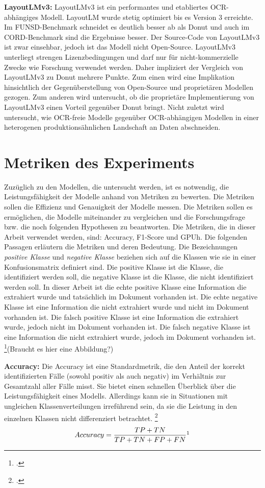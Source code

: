 \textbf{LayoutLMv3:} LayoutLMv3 ist ein performantes und etabliertes OCR-abhängiges Modell. LayoutLM wurde stetig optimiert bis es Version 3 erreichte. Im FUNSD-Benchmark schneidet es deutlich besser ab als Donut und auch im CORD-Benchmark sind die Ergebnisse besser. Der Source-Code von LayoutLMv3 ist zwar einsehbar, jedoch ist das Modell nicht Open-Source. LayoutLMv3 unterliegt strengen Lizenzbedingungen und darf nur für nicht-kommerzielle Zwecke wie Forschung verwendet werden. Daher impliziert der Vergleich von LayoutLMv3 zu Donut mehrere Punkte. Zum einen wird eine Implikation hinsichtlich der Gegenüberstellung von Open-Source und proprietären Modellen gezogen. Zum anderen wird untersucht, ob die proprietäre Implementierung von LayoutLMv3 einen Vorteil gegenüber Donut bringt. Nicht zuletzt wird untersucht, wie OCR-freie Modelle gegenüber OCR-abhängigen Modellen in einer heterogenen produktionsähnlichen Landschaft an Daten abschneiden.

\section{Metriken des Experiments}
Zuzüglich zu den Modellen, die untersucht werden, ist es notwendig, die Leistungsfähigkeit der Modelle anhand von Metriken zu bewerten. Die Metriken sollen die Effizienz und Genauigkeit der Modelle messen. Die Metriken sollen es ermöglichen, die Modelle miteinander zu vergleichen und die Forschungsfrage bzw. die noch folgenden Hypothesen zu beantworten. Die Metriken, die in dieser Arbeit verwendet werden, sind: Accuracy, F1-Score und \ac{GPUh}. Die folgenden Passagen erläutern die Metriken und deren Bedeutung. Die Bezeichnungen \emph{positive Klasse} und \emph{negative Klasse} beziehen sich auf die Klassen wie sie in einer Konfusionsmatrix definiert sind. Die positive Klasse ist die Klasse, die identifiziert werden soll, die negative Klasse ist die Klasse, die nicht identifiziert werden soll. In dieser Arbeit ist die echte positive Klasse eine Information die extrahiert wurde und tatsächlich im Dokument vorhanden ist. Die echte negative Klasse ist eine Information die nicht extrahiert wurde und nicht im Dokument vorhanden ist. Die falsch positive Klasse ist eine Information die extrahiert wurde, jedoch nicht im Dokument vorhanden ist. Die falsch negative Klasse ist eine Information die nicht extrahiert wurde, jedoch im Dokument vorhanden ist. \footcites[Vgl.][]{pawan_confusion_2019}(Braucht es hier eine Abbildung?)

\textbf{Accuracy:} Die Accuracy ist eine Standardmetrik, die den Anteil der korrekt identifizierten Fälle (sowohl positiv als auch negativ) im Verhältnis zur Gesamtzahl aller Fälle misst. Sie bietet einen schnellen Überblick über die Leistungsfähigkeit eines Modells. Allerdings kann sie in Situationen mit ungleichen Klassenverteilungen irreführend sein, da sie die Leistung in den einzelnen Klassen nicht differenziert betrachtet. \footcites[Vgl.][S. 508]{naser_error_2023}
\begin{equation}
    {Accuracy} = \frac{TP + TN}{TP + TN + FP + FN} \footnotemark
\end{equation}

